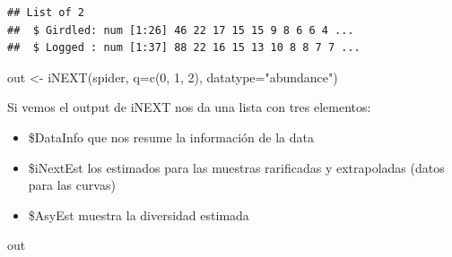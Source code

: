 \documentclass[
]{article}
\newenvironment{Shaded}{\begin{snugshade}}{\end{snugshade}}
\newcommand{\AttributeTok}[1]{\textcolor[rgb]{0.77,0.63,0.00}{#1}}
\newcommand{\DecValTok}[1]{\textcolor[rgb]{0.00,0.00,0.81}{#1}}
\newcommand{\FunctionTok}[1]{\textcolor[rgb]{0.00,0.00,0.00}{#1}}
\newcommand{\NormalTok}[1]{#1}
\newcommand{\OtherTok}[1]{\textcolor[rgb]{0.56,0.35,0.01}{#1}}
\newcommand{\StringTok}[1]{\textcolor[rgb]{0.31,0.60,0.02}{#1}}
\begin{document}
\begin{verbatim}
## List of 2
##  $ Girdled: num [1:26] 46 22 17 15 15 9 8 6 6 4 ...
##  $ Logged : num [1:37] 88 22 16 15 13 10 8 8 7 7 ...
\end{verbatim}

\begin{Shaded}
\begin{Highlighting}[]
\NormalTok{out }\OtherTok{\textless{}{-}} \FunctionTok{iNEXT}\NormalTok{(spider, }\AttributeTok{q=}\FunctionTok{c}\NormalTok{(}\DecValTok{0}\NormalTok{, }\DecValTok{1}\NormalTok{, }\DecValTok{2}\NormalTok{), }\AttributeTok{datatype=}\StringTok{"abundance"}\NormalTok{)}
\end{Highlighting}
\end{Shaded}

Si vemos el output de iNEXT nos da una lista con tres elementos:

\begin{itemize}
\item
  \$DataInfo que nos resume la información de la data
\item
  \$iNextEst los estimados para las muestras rarificadas y extrapoladas
  (datos para las curvas)
\item
  \$AsyEst muestra la diversidad estimada
\end{itemize}

\begin{Shaded}
\begin{Highlighting}[]
\NormalTok{out}
\end{Highlighting}
\end{Shaded}
\end{document}
